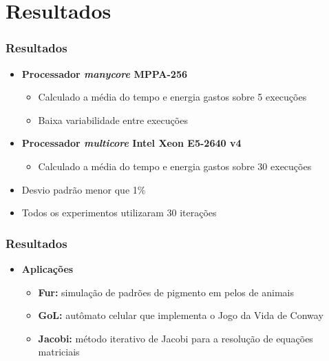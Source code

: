 \documentclass[xcolor={table}]{beamer}
\begin{document}
\begin{frame}
\begin{flushleft}
    \end{flushleft}
\end{frame}


\section{Resultados}
\begin{frame}\frametitle{Resultados}
    \begin{itemize}
        \item{\textbf{Processador \textit{manycore} MPPA-256}}
            \begin{itemize}
                \item{Calculado a média do tempo e energia gastos sobre 5 execuções}
                \item{Baixa variabilidade entre execuções}
            \end{itemize}
        \item{\textbf{Processador \textit{multicore} Intel Xeon E5-2640 v4}}
            \begin{itemize}
                \item{Calculado a média do tempo e energia gastos sobre 30 execuções}
            \end{itemize}
        \item{Desvio padrão menor que 1$\%$}
        \item{Todos os experimentos utilizaram 30 iterações}
    \end{itemize}
\end{frame}

\begin{frame}\frametitle{Resultados}
    \begin{itemize}
        \item \textbf{Aplicações}
            \begin{itemize}
                \item \textbf{Fur:} simulação de padrões de pigmento em pelos de animais~\cite{Castro-Podesta-ERAD:2016}
                \item\textbf{GoL:} autômato celular que implementa o Jogo da Vida de Conway~\cite{pereira15}
                \item\textbf{Jacobi:} método iterativo de Jacobi para a resolução de equações matriciais~\cite{pereira15}
            \end{itemize}
    \end{itemize}
\end{frame}
\end{document}
